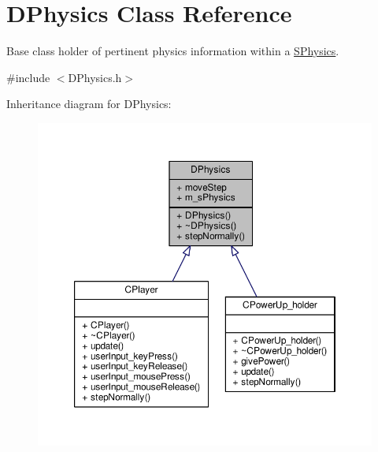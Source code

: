 \hypertarget{classDPhysics}{\section{D\-Physics Class Reference}
\label{classDPhysics}
}


Base class holder of pertinent physics information within a \hyperlink{structDPhysics_1_1SPhysics}{S\-Physics}.  




{\ttfamily \#include $<$D\-Physics.\-h$>$}



Inheritance diagram for D\-Physics\-:\nopagebreak
\begin{figure}[H]
\begin{center}
\leavevmode
\includegraphics[width=350pt]{classDPhysics__inherit__graph}
\end{center}
\end{figure}


